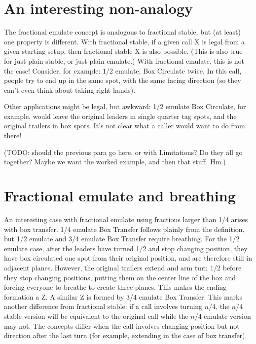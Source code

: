 \documentclass[11pt]{article}
\begin{document}
\section{An interesting non-analogy}
\label{sec:nonanalogy}

The fractional emulate concept is analogous to fractional stable,
but (at least) one property is different.
With fractional stable,
if a given call X is legal from a given starting setup,
then fractional stable X is also possible.
(This is also true for just plain stable, or just plain emulate.)
With fractional emulate, this is not the case!
Consider, for example: 1/2 emulate, Box Circulate twice.
In this call, people try to end up in the same spot,
with the same facing direction
(so they can't even think about taking right hands).

Other applications might be legal, but awkward:
1/2 emulate Box Circulate, for example,
would leave the original leaders in single quarter tag spots,
and the original trailers in box spots.
It's not clear what a caller would want to do from there!

(TODO: should the previous para go here, or with Limitations?
Do they all go together?  Maybe we want the worked example,
and then that stuff.  Hm.)

\section{Fractional emulate and breathing}

An interesting case with fractional emulate using fractions larger
than 1/4 arises with box transfer. 1/4 emulate Box Transfer
follows plainly from the definition,
but 1/2 emulate and 3/4 emulate
Box Transfer require breathing. For the 1/2 emulate case, after the leaders
have turned 1/2 and stop changing position, they have box circulated
one spot from their original position, and are therefore still in
adjacent planes. However, the original trailers extend and arm turn 1/2
before they stop changing positions, putting them on the center line
of the box and forcing everyone to breathe to create three planes.
This makes the ending formation a Z.
A similar Z is formed by
3/4 emulate Box Transfer. This marks another difference from
fractional stable: if a call involves turning $n$/4, the $n$/4 stable
version will be equivalent to the original call while the $n$/4
emulate version may not. The concepts differ when the call involves
changing position but not direction after the last turn (for example,
extending in the case of box transfer).
\end{document}
